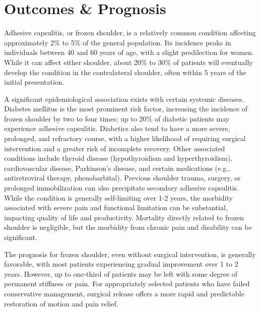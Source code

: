\section*{Outcomes \& Prognosis}
Adhesive capsulitis, or frozen shoulder, is a relatively common condition affecting approximately 2\% to 5\% of the general population. Its incidence peaks in individuals between 40 and 60 years of age, with a slight predilection for women. While it can affect either shoulder, about 20\% to 30\% of patients will eventually develop the condition in the contralateral shoulder, often within 5 years of the initial presentation.

A significant epidemiological association exists with certain systemic diseases. Diabetes mellitus is the most prominent risk factor, increasing the incidence of frozen shoulder by two to four times; up to 20\% of diabetic patients may experience adhesive capsulitis. Diabetics also tend to have a more severe, prolonged, and refractory course, with a higher likelihood of requiring surgical intervention and a greater risk of incomplete recovery. Other associated conditions include thyroid disease (hypothyroidism and hyperthyroidism), cardiovascular disease, Parkinson's disease, and certain medications (e.g., antiretroviral therapy, phenobarbital). Previous shoulder trauma, surgery, or prolonged immobilization can also precipitate secondary adhesive capsulitis. While the condition is generally self-limiting over 1-2 years, the morbidity associated with severe pain and functional limitation can be substantial, impacting quality of life and productivity. Mortality directly related to frozen shoulder is negligible, but the morbidity from chronic pain and disability can be significant.

The prognosis for frozen shoulder, even without surgical intervention, is generally favorable, with most patients experiencing gradual improvement over 1 to 2 years. However, up to one-third of patients may be left with some degree of permanent stiffness or pain. For appropriately selected patients who have failed conservative management, surgical release offers a more rapid and predictable restoration of motion and pain relief.

